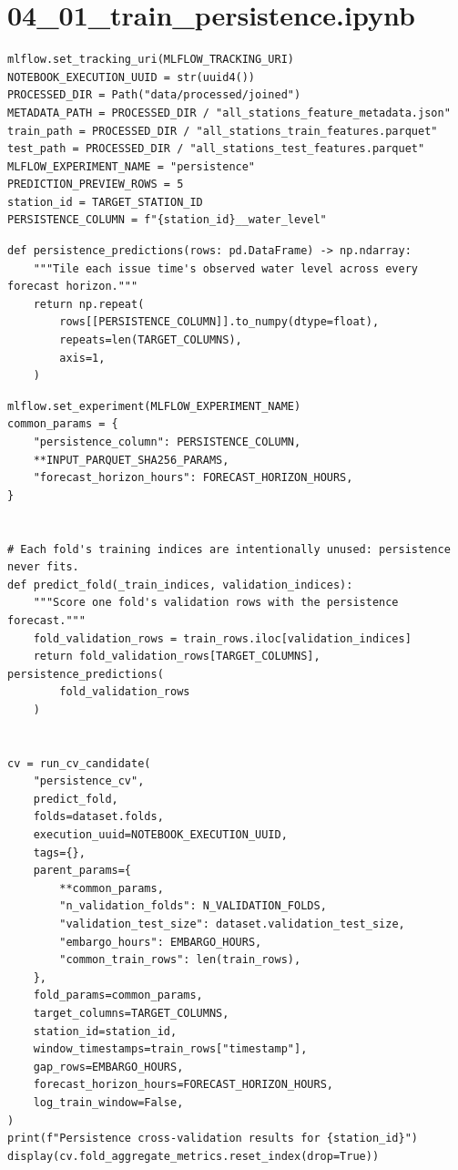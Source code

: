 \section{04\_01\_train\_persistence.ipynb}

\begin{verbatim}
mlflow.set_tracking_uri(MLFLOW_TRACKING_URI)
NOTEBOOK_EXECUTION_UUID = str(uuid4())
PROCESSED_DIR = Path("data/processed/joined")
METADATA_PATH = PROCESSED_DIR / "all_stations_feature_metadata.json"
train_path = PROCESSED_DIR / "all_stations_train_features.parquet"
test_path = PROCESSED_DIR / "all_stations_test_features.parquet"
MLFLOW_EXPERIMENT_NAME = "persistence"
PREDICTION_PREVIEW_ROWS = 5
station_id = TARGET_STATION_ID
PERSISTENCE_COLUMN = f"{station_id}__water_level"
\end{verbatim}

\begin{verbatim}
def persistence_predictions(rows: pd.DataFrame) -> np.ndarray:
    """Tile each issue time's observed water level across every forecast horizon."""
    return np.repeat(
        rows[[PERSISTENCE_COLUMN]].to_numpy(dtype=float),
        repeats=len(TARGET_COLUMNS),
        axis=1,
    )
\end{verbatim}

\begin{verbatim}
mlflow.set_experiment(MLFLOW_EXPERIMENT_NAME)
common_params = {
    "persistence_column": PERSISTENCE_COLUMN,
    **INPUT_PARQUET_SHA256_PARAMS,
    "forecast_horizon_hours": FORECAST_HORIZON_HOURS,
}


# Each fold's training indices are intentionally unused: persistence never fits.
def predict_fold(_train_indices, validation_indices):
    """Score one fold's validation rows with the persistence forecast."""
    fold_validation_rows = train_rows.iloc[validation_indices]
    return fold_validation_rows[TARGET_COLUMNS], persistence_predictions(
        fold_validation_rows
    )


cv = run_cv_candidate(
    "persistence_cv",
    predict_fold,
    folds=dataset.folds,
    execution_uuid=NOTEBOOK_EXECUTION_UUID,
    tags={},
    parent_params={
        **common_params,
        "n_validation_folds": N_VALIDATION_FOLDS,
        "validation_test_size": dataset.validation_test_size,
        "embargo_hours": EMBARGO_HOURS,
        "common_train_rows": len(train_rows),
    },
    fold_params=common_params,
    target_columns=TARGET_COLUMNS,
    station_id=station_id,
    window_timestamps=train_rows["timestamp"],
    gap_rows=EMBARGO_HOURS,
    forecast_horizon_hours=FORECAST_HORIZON_HOURS,
    log_train_window=False,
)
print(f"Persistence cross-validation results for {station_id}")
display(cv.fold_aggregate_metrics.reset_index(drop=True))
\end{verbatim}

